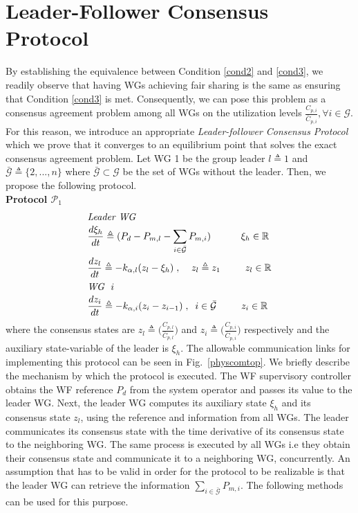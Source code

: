 \documentclass[letterpaper, 10 pt, conference]{ieeeconf}
\begin{document}
\section{Leader-Follower Consensus Protocol}
By establishing the equivalence between Condition \ref{cond2} and \ref{cond3}, we readily observe that
 having WGs achieving fair sharing is the same as ensuring that Condition \ref{cond3} is met. Consequently, we can pose this problem as a consensus agreement problem among all WGs on the utilization levels $\frac{C_{p,i}}{\bar{C}_{p,i}},\forall i\in\mathcal{G}$. For this reason, we introduce an appropriate \textit{Leader-follower Consensus Protocol}  which we prove that it converges to an equilibrium point that solves the exact consensus agreement problem. Let WG 1 be the group leader $l\triangleq 1$ and $\bar{\mathcal{G}}\triangleq\{2,...,n\}$ where $\bar{\mathcal{G}}\subset \mathcal{G}$  be the set of WGs without the leader. Then, we propose the following protocol.\\
\textbf{Protocol $\mathcal{P}_1$}
\begin{subequations}
\begin{align}
\intertext{\textit{Leader WG}}
&\frac{d\xi_h}{dt}\triangleq(P_d-P_{m,l}-\sum_{i\in\bar{\mathcal{G}}} P_{m,i})\hspace{11mm}\xi_h\in\mathbb{R}\label{consensus_equations1}\\
&\frac{dz_l}{dt}\triangleq-k_{\alpha,l}(z_l-\xi_h)\;,\;\;\;\; z_l\triangleq z_1 \hspace{9mm}z_l\in\mathbb{R}\label{consensus_equations2}\\
\intertext{\textit{WG} \;$i$}
&\frac{dz_i}{dt}\triangleq-k_{\alpha,i}(z_i-z_{i-1})\;,\;\;i\in\bar{\mathcal{G}} \hspace{9mm}z_i\in\mathbb{R}\label{consensus_equations3}
\end{align}
\end{subequations}
where the consensus states are $z_l\triangleq\Big(\frac{C_{p,l}}{\bar{C}_{p,l}}\Big)$ and $z_i\triangleq\Big(\frac{C_{p,i}}{\bar{C}_{p,i}}\Big)$ respectively and the auxiliary state-variable of the leader is  $\xi_h$. The allowable communication links for implementing this protocol can be seen in Fig.~\ref{physcomtop}.  
We briefly describe the mechanism by which the protocol is executed. The WF supervisory controller obtains the WF reference $P_d$ from the system operator and passes its value to the leader WG. Next, the leader WG computes its auxiliary state $\xi_h$ and its consensus state $z_l$, using the reference and information from all WGs. The leader communicates its consensus state with the time derivative of its consensus state to the neighboring WG. The same process is executed by all WGs i.e they obtain their consensus state and communicate it to a neighboring WG, concurrently.  An assumption that has to be valid in order for the protocol to be realizable is that the leader WG can retrieve the information $\sum_{i\in\bar{\mathcal{G}}}P_{m,i}$. The following methods can be used for this purpose.
\end{document}
